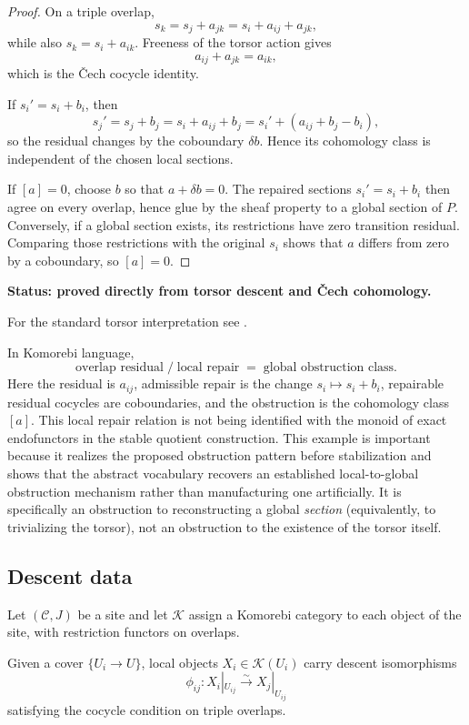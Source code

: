 \documentclass[11pt]{article}
\theoremstyle{definition}
\theoremstyle{remark}
\newcommand{\status}[1]{\textbf{Status: #1.}}
\begin{document}
\begin{proof}
On a triple overlap,
\[
s_k=s_j+a_{jk}=s_i+a_{ij}+a_{jk},
\]
while also $s_k=s_i+a_{ik}$. Freeness of the torsor action gives
\[
a_{ij}+a_{jk}=a_{ik},
\]
which is the \v{C}ech cocycle identity.

If $s_i'=s_i+b_i$, then
\[
s_j'=s_j+b_j=s_i+a_{ij}+b_j
=s_i'+(a_{ij}+b_j-b_i),
\]
so the residual changes by the coboundary $\delta b$. Hence its cohomology class is independent of the chosen local sections.

If $[a]=0$, choose $b$ so that $a+\delta b=0$. The repaired sections $s_i'=s_i+b_i$ then agree on every overlap, hence glue by the sheaf property to a global section of $P$. Conversely, if a global section exists, its restrictions have zero transition residual. Comparing those restrictions with the original $s_i$ shows that $a$ differs from zero by a coboundary, so $[a]=0$.
\end{proof}

\status{proved directly from torsor descent and \v{C}ech cohomology}

For the standard torsor interpretation see \cite{StacksTorsors}.

In Komorebi language,
\[
\boxed{
\text{overlap residual}
\;/\;
\text{local repair}
\;=\;
\text{global obstruction class}.}
\]
Here the residual is $a_{ij}$, admissible repair is the change $s_i\mapsto s_i+b_i$, repairable residual cocycles are coboundaries, and the obstruction is the cohomology class $[a]$. This local repair relation is not being identified with the monoid of exact endofunctors in the stable quotient construction. This example is important because it realizes the proposed obstruction pattern before stabilization and shows that the abstract vocabulary recovers an established local-to-global obstruction mechanism rather than manufacturing one artificially.
It is specifically an obstruction to reconstructing a global \emph{section} (equivalently, to trivializing the torsor), not an obstruction to the existence of the torsor itself.

\subsection{Descent data}

Let $(\mathcal C,J)$ be a site and let $\mathscr K$ assign a Komorebi category to each object of the site, with restriction functors on overlaps.

Given a cover $\{U_i\to U\}$, local objects $X_i\in\mathscr K(U_i)$ carry descent isomorphisms
\[
\phi_{ij}:X_i|_{U_{ij}}\xrightarrow{\sim}X_j|_{U_{ij}}
\]
satisfying the cocycle condition on triple overlaps.
\end{document}
